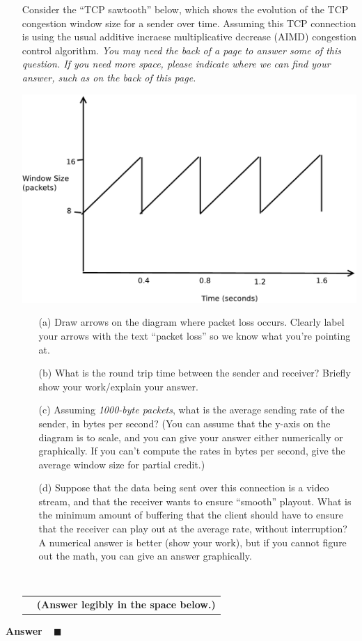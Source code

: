 \documentclass[11pt]{article}
\newcounter{pctr}
\newcommand{\ansbelow}{\probnote{Answer legibly in the space below.}}
\newcommand{\sols}[1]{#1}
\newcommand{\sols}[1]{}
\newcounter{answer}
\newenvironment{answer}[1][\relax]{\refstepcounter{answer}\begin{list}%
 {}{\leftmargin 0pt\rightmargin 0pt\labelsep 3pt\parsep 0pt%
 \setlength{\listparindent}{\parindent}}
    \item {\bf Answer \theanswer #1}\
    }{\hspace*{\fill}$\blacksquare$\end{list}}
\newcommand\prob[1]%
  {\begin{itemize}\item[]%
   \vspace{.2in}{\bf\thepctr. ~[#1~ points]:}\stepcounter{pctr}}
\newcommand\eprob{\end{itemize}}
\newcommand\probnote[1]%
  {\\\begin{tabular}{cr} \hspace{3in} & {\bf (#1)} \\ \end{tabular}}
\begin{document}
\pagebreak
\prob{16} Consider the ``TCP sawtooth'' below, which shows the evolution
of the TCP congestion window size for a sender over time. Assuming this
TCP connection is using the usual additive incraese multiplicative
decrease (AIMD) congestion control algorithm. {\em You may need the back
  of a page to answer some of this question.  If you need more space,
  please indicate where we can find your answer, such as on the back of
  this page.}
\begin{center}
\includegraphics[width=0.65\linewidth]{tcp}
\end{center}
\begin{itemize}
\item[(a)] Draw arrows on the diagram where packet loss occurs.  Clearly
  label your arrows with the text ``packet loss'' so we know what you're
  pointing at. 
\item[(b)] What is the round trip time between the sender and receiver?
  Briefly show your work/explain your answer.
\item[(c)] Assuming {\em 1000-byte packets}, what is the average sending rate
  of the sender, in bytes per second?  (You can assume that the y-axis
  on the diagram is to scale, and you can give your answer either
  numerically or graphically.  If you can't compute the rates in bytes
  per second, give the average window size for partial credit.)
\item[(d)] Suppose that the data being sent over this connection is a video
  stream, and that the receiver wants to ensure ``smooth'' playout.
  What is the minimum amount of buffering that the client should have to
  ensure that the receiver can play out at the average rate, without
  interruption?  A numerical answer is better (show your work), but if
  you cannot figure out the math, you can give an answer graphically.
\end{itemize}
~\ansbelow \eprob
\vspace*{1.25in}
\sols{
\begin{answer}
\end{answer}
}
\end{document}
